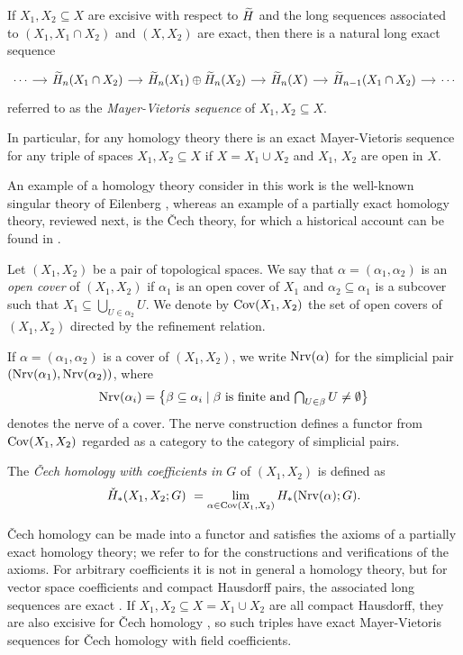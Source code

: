 If $X_{1}, X_{2} \subseteq X$ are excisive with respect to $\widetilde{H}$ and the long sequences associated to $(X_{1}, X_{1} \cap X_{2})$ and $(X, X_{2})$ are exact, then there is a natural long exact sequence
\[
\begin{tikzcd}[column sep = small]
\cdots \arrow[r] & \H_{n}(X_{1} \cap X_{2}) \arrow[r] & \H_{n}(X_{1}) \oplus \H_{n}(X_{2}) \arrow[r] & \H_{n}(X) \arrow[r] & \H_{n-1}(X_{1} \cap X_{2}) \arrow[r] & \cdots
\end{tikzcd}
\]
referred to as the \emph{Mayer-Vietoris sequence} of $X_{1}, X_{2} \subseteq X$. 

In particular, for any homology theory there is an exact Mayer-Vietoris sequence for any triple of spaces $X_{1}, X_{2} \subseteq X$ if $X = X_{1} \cup X_{2}$ and $X_{1}$, $X_{2}$ are open in $X$.

An example of a homology theory consider in this work is the well-known singular theory of Eilenberg \cite{Eilenberg.1944}, whereas an example of a partially exact homology theory, reviewed next, is the \v{C}ech theory, for which a historical account can be found in \cite{Edwards.1980}.

Let $(X_{1},X_{2})$ be a pair of topological spaces. We say that $\alpha = (\alpha_1, \alpha_2)$ is an \emph{open cover} of $(X_1, X_2)$ if $\alpha_1$ is an open cover of $X_1$ and $\alpha_2 \subseteq \alpha_1$ is a subcover such that $X_1 \subseteq \bigcup_{U \in \alpha_2} U$.
We denote by $\operatorname{Cov}(X_{1}, X_{2})$ the set of open covers of $(X_{1}, X_{2})$ directed by the refinement relation. 

If $\alpha = (\alpha_{1}, \alpha_{2})$ is a cover of $(X_{1}, X_{2})$, we write $\operatorname{Nrv}(\alpha)$ for the simplicial pair $(\operatorname{Nrv}(\alpha_{1}),\operatorname{Nrv}(\alpha_{2}))$, where 
\[
\operatorname{Nrv}(\alpha_{i}) =
\big\{ \beta \subseteq \alpha_{i} \mid \beta \text{ is finite and } \textstyle{\bigcap_{U \in \beta}} \, U \neq \emptyset \big\}
\]
denotes the nerve of a cover. The nerve construction defines a functor from $\operatorname{Cov}(X_{1},X_{2})$ regarded as a category to the category of simplicial pairs. 

The \emph{\v{C}ech homology with coefficients in $G$} of $(X_{1},X_{2})$ is defined as
\[
\check{H}_{*}(X_{1}, X_{2}; G) \ =
\lim_{\alpha \in \operatorname{Cov}(X_{1}, X_{2})} H_{*}(\operatorname{Nrv}(\alpha); G).
\]

\v{C}ech homology can be made into a functor and satisfies the axioms of a partially exact homology theory; we refer to \cite[Section IX--X]{MR0050886} for the constructions and verifications of the axioms.
For arbitrary coefficients it is not in general a homology theory, but for vector space coefficients and compact Hausdorff pairs, the associated long sequences are exact \cite{Kelly.1961}.
If $X_{1}, X_{2} \subseteq X = X_{1} \cup X_2$ are all compact Hausdorff, they are also excisive for \v{C}ech homology \cite[Sections X.1, X.5]{MR0050886}, so such triples have exact Mayer-Vietoris sequences for \v{C}ech homology with field coefficients.

